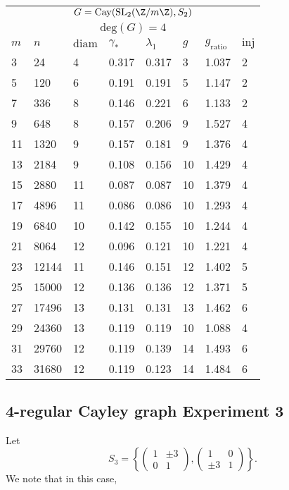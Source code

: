 \begin{center}
	\begin{tabular}{ p{1cm}|p{1cm}|p{1cm}|p{1cm}|p{1cm}|p{1cm}|p{1cm}|p{1cm} }
		\multicolumn{8}{c}{$G = \mathrm{Cay}(\mathrm{SL}_2(\Z/m\Z),S_2)$} \\
		\multicolumn{8}{c}{$\mathrm{deg}(G) = 4$} \\
		\hline
		$m$ & $n$ &  $\mathrm{diam}$ & $\gamma_*$ &  $\lambda_1$ & $g$ & $g_{\mathrm{ratio}}$ & $\mathrm{inj}$     \\
		\hline
		3 & 24 & 4 &  0.317 & 0.317 & 3 & 1.037 & 2 \\
		5 & 120 & 6 &  0.191 & 0.191 & 5 & 1.147 & 2 \\
		7 & 336 & 8 &  0.146 & 0.221 & 6 & 1.133 & 2 \\
		9 & 648 & 8 &  0.157 & 0.206 & 9 & 1.527 & 4 \\
		11 & 1320 & 9 &  0.157 & 0.181 & 9 & 1.376 & 4 \\
		13 & 2184 & 9 &  0.108 & 0.156 & 10 & 1.429 & 4 \\
		15 & 2880 & 11 &  0.087 & 0.087 & 10 & 1.379 & 4 \\
		17 & 4896 & 11 &  0.086 & 0.086 & 10 & 1.293 & 4 \\
		19 & 6840 & 10 &  0.142 & 0.155 & 10 & 1.244 & 4 \\
		21 & 8064 & 12 &  0.096 & 0.121 & 10 & 1.221 & 4 \\
		23 & 12144 & 11 &  0.146 & 0.151 & 12 & 1.402 & 5 \\
		25 & 15000 & 12 &  0.136 & 0.136 & 12 & 1.371 & 5 \\
		27 & 17496 & 13 &  0.131 & 0.131 & 13 & 1.462 & 6 \\
		29 & 24360 & 13 &  0.119 & 0.119 & 10 & 1.088 & 4 \\
		31 & 29760 & 12 &  0.119 & 0.139 & 14 & 1.493 & 6 \\
		33 & 31680 & 12 &  0.119 & 0.123 & 14 & 1.484 & 6 
	\end{tabular}
\end{center}

\newpage

\subsection{4-regular Cayley graph Experiment 3}


Let 
$$S_3 = \left\{  \begin{pmatrix}
1 & \pm 3 \\ 0 & 1
\end{pmatrix}, \begin{pmatrix}
1 & 0 \\ \pm 3 & 1
\end{pmatrix}  \right\}.$$ We note that in this case,  

